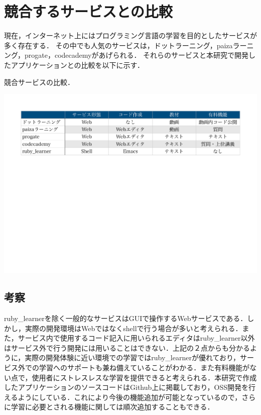 \chapter{競合するサービスとの比較}\label{ux4ed6ux306eux30bdux30d5ux30c8ux3068ux306eux6bd4ux8f03}
現在，インターネット上にはプログラミング言語の学習を目的としたサービスが多く存在する．
その中でも人気のサービスは，ドットラーニング，paizaラーニング，progate，codecademyがあげられる．
それらのサービスと本研究で開発したアプリケーションとの比較を以下に示す．
\begin{table}[H]
\centering
\begin{center}
\caption{競合サービスの比較．\label{service_compare}}
\includegraphics[width=150mm]{../../picture/service_compare.pdf}
\end{center}
\label{fig:}
\end{table}

\section{考察}\label{ux8003ux5bdf}
ruby\_learnerを除く一般的なサービスはGUIで操作するWebサービスである．しかし，実際の開発環境はWebではなくshellで行う場合が多いと考えられる．また，サービス内で使用するコード記入に用いられるエディタはruby\_learner以外はサービス外で行う開発には用いることはできない．上記の２点からも分かるように，実際の開発体験に近い環境での学習ではruby\_learnerが優れており，サービス外での学習へのサポートも兼ね備えていることがわかる．また有料機能がない点で，使用者にストレスレスな学習を提供できると考えられる．本研究で作成したアプリケーションのソースコードはGithub上に掲載しており，OSS開発を行えるようにしている．これにより今後の機能追加が可能となっているので，さらに学習に必要とされる機能に関しては順次追加することもできる．
